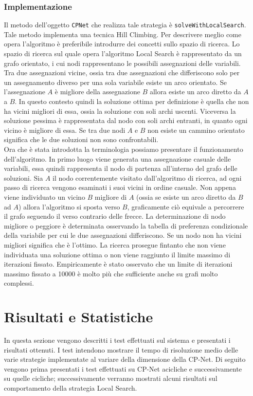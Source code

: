 \documentclass[a4paper,titlepage]{article}
\begin{document}
\subsubsection{Implementazione}
Il metodo dell'oggetto \texttt{CPNet} che realizza tale strategia è \texttt{solveWithLocalSearch}. Tale metodo implementa una tecnica Hill Climbing. Per descrivere meglio come opera l'algoritmo è preferibile introdurre dei concetti sullo spazio di ricerca. Lo spazio di ricerca sul quale opera l'algoritmo Local Search è rappresentato da un grafo orientato, i cui nodi rappresentano le possibili assegnazioni delle variabili. Tra due assegnazioni vicine, ossia tra due assegnazioni che differiscono solo per un assegnamento diverso per una sola variabile esiste un arco orientato. Se l'assegnazione $A$ è migliore della assegnazione $B$ allora esiste un arco diretto da $A$ a $B$. In questo contesto quindi la soluzione ottima per definizione è quella che non ha vicini migliori di essa, ossia la soluzione con soli archi uscenti. Viceversa la soluzione pessima è rappresentata dal nodo con soli archi entranti, in quanto ogni vicino è migliore di essa. Se tra due nodi $A$ e $B$ non esiste un cammino orientato significa che le due soluzioni non sono confrontabili.\\
Ora che è stata introdotta la terminologia possiamo presentare il funzionamento dell'algoritmo. In primo luogo viene generata una assegnazione casuale delle variabili, essa quindi rappresenta il nodo di partenza all'interno del grafo delle soluzioni. Sia $A$ il nodo correntemente visitato dall'algoritmo di ricerca, ad ogni passo di ricerca vengono esaminati i suoi vicini in ordine casuale. Non appena viene individuato un vicino $B$ migliore di $A$ (ossia se esiste un arco diretto da $B$ ad $A$) allora l'algoritmo si sposta verso $B$, graficamente ciò equivale a percorrere il grafo seguendo il verso contrario delle frecce. La determinazione di nodo migliore o peggiore è determinata osservando la tabella di preferenza condizionale della variabile per cui le due assegnazioni differiscono. Se un nodo non ha vicini migliori significa che è l'ottimo. La ricerca prosegue fintanto che non viene individuata una soluzione ottima o non viene raggiunto il limite massimo di iterazioni fissato. Empiricamente è stato osservato che un limite di iterazioni massimo fissato a 10000 è molto più che sufficiente anche su grafi molto complessi.


\section{Risultati e Statistiche}
In questa sezione vengono descritti i test effettuati sul sistema e presentati i risultati ottenuti. I test intendono mostrare il tempo di risoluzione medio delle varie strategie implementate al variare della dimensione della CP-Net. Di seguito vengono prima presentati i test effettuati su CP-Net acicliche e successivamente su quelle cicliche; successivamente verranno mostrati alcuni risultati sul comportamento della strategia Local Search.
\end{document}
